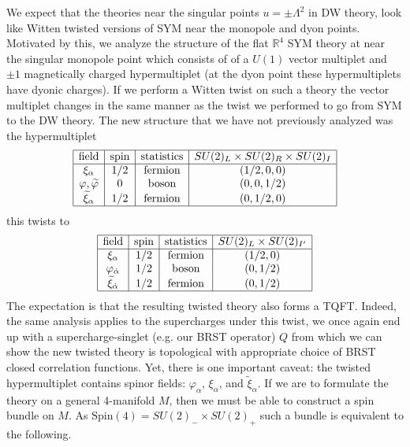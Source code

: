 \documentclass[12pt, onecolumn]{article}
\begin{document}
\noindent We expect that the theories near the singular points $u=\pm \Lambda^2$ in DW theory, look like Witten twisted versions of SYM near the monopole and dyon points.  Motivated by this, we analyze the structure of the flat $\mathbb{R}^{4}$ SYM theory at near the singular monopole point which consists of of a $U(1)$ vector multiplet and $\pm 1$ magnetically charged hypermultiplet (at the dyon point these hypermultiplets have dyonic charges).  If we perform a Witten twist on such a theory the vector multiplet changes in the same manner as the twist we performed to go from SYM to the DW theory.  The new structure that we have not previously analyzed was the hypermultiplet %
\begin{align*}
\begin{array}{|c|c|c|c|}
\hline
\text{field} & \text{spin} & \text{statistics} & SU(2)_{L} \times SU(2)_{R} \times SU(2)_{I}\\
\hline
\xi_{\alpha} & 1/2 & \text{fermion} & (1/2,0,0)\\
\varphi, \widetilde{\varphi} & 0 & \text{boson} & (0,0,1/2)\\
\widetilde{\xi}_{\alpha} & 1/2 & \text{fermion} & (0,1/2,0)\\
\hline
\end{array}
\end{align*}
this twists to
\begin{align*}
\begin{array}{|c|c|c|c|}
\hline
\text{field} & \text{spin} & \text{statistics} & SU(2)_{L} \times SU(2)_{I'}\\
\hline
\xi_{\alpha} & 1/2 & \text{fermion} & (1/2,0)\\
\varphi_{\dot{\alpha}} & 1/2 & \text{boson} & (0,1/2)\\
\widetilde{\xi}_{\dot{\alpha}} & 1/2 & \text{fermion} & (0,1/2)\\
\hline
\end{array}
\end{align*}
The expectation is that the resulting twisted theory also forms a TQFT.  Indeed, the same analysis applies to the supercharges under this twist, we once again end up with a supercharge-singlet (e.g. our BRST operator) $Q$ from which we can show the new twisted theory is topological with appropriate choice of BRST closed correlation functions.  Yet, there is one important caveat: the twisted hypermultiplet contains spinor fields: $\varphi_{\alpha},\,\xi_{\alpha}$, and $\widetilde{\xi}_{\dot{\alpha}}$.  If we are to formulate the theory on a general 4-manifold $M$, then we must be able to construct a spin bundle on $M$.  As $\text{Spin}(4)=SU(2)_{-} \times SU(2)_{+}$ such a bundle is equivalent to the following.
\end{document}
